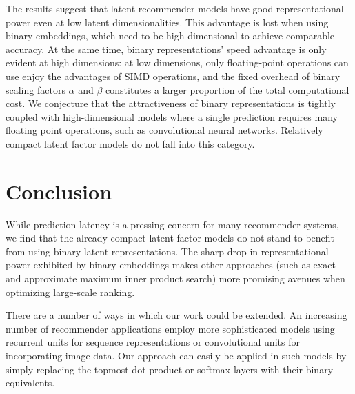 \documentclass[sigchi]{acmart}
\begin{document}
The results suggest that latent recommender models have good representational power even at low latent dimensionalities. This advantage is lost when using binary embeddings, which need to be high-dimensional to achieve comparable accuracy. At the same time, binary representations' speed advantage is only evident at high dimensions: at low dimensions, only floating-point operations can use enjoy the advantages of SIMD operations, and the fixed overhead of binary scaling factors $\alpha$ and $\beta$ constitutes a larger proportion of the total computational cost. We conjecture that the attractiveness of binary representations is tightly coupled with high-dimensional models where a single prediction requires many floating point operations, such as convolutional neural networks. Relatively compact latent factor models do not fall into this category.

\section{Conclusion}
While prediction latency is a pressing concern for many recommender systems, we find that the already compact latent factor models do not stand to benefit from using binary latent representations. The sharp drop in representational power exhibited by binary embeddings makes other approaches (such as exact \citep{koenigstein2012efficient} and approximate \citep{shrivastava2014asymmetric} maximum inner product search) more promising avenues when optimizing large-scale ranking.

There are a number of ways in which our work could be extended. An increasing number of recommender applications employ more sophisticated models using recurrent units for sequence representations or convolutional units for incorporating image data. Our approach can easily be applied in such models by simply replacing the topmost dot product or softmax layers with their binary equivalents.




\end{document}

